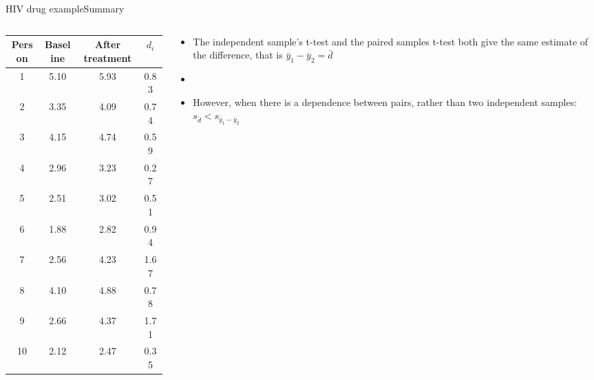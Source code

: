 \documentclass[xcolor=dvipsnames]{beamer}
\begin{document}
\begin{frame}{HIV drug example}{Summary}
\begin{columns}
	\begin{column}{.4 \textwidth}
		{\tiny
			\begin{tabular}{|c|c|c|c|}
				\hline
				\textbf{Person} & \textbf{Baseline} &  \textbf{After treatment} & $d_i$ \\ \hline \hline
				1  &    5.10 &   5.93 &  0.83 \\ \hline 
				2  &    3.35 &   4.09 &  0.74 \\ \hline 
				3  &   4.15  &  4.74 &  0.59 \\ \hline 
				4  &   2.96  &  3.23 &  0.27 \\ \hline 
				5  &    2.51 &   3.02 &  0.51 \\ \hline 
				6  &   1.88  &  2.82 &  0.94 \\ \hline 
				7  &   2.56  &  4.23 &  1.67 \\ \hline 
				8  &    4.10 &   4.88 &  0.78 \\ \hline 
				9  &   2.66  &  4.37 &  1.71 \\ \hline 
				10  &    2.12  &  2.47 &  0.35 \\ \hline 
			\end{tabular}
		}
	\end{column}
	\begin{column}{.6 \textwidth}
		\begin{itemize}
			\item The independent sample's t-test and the paired samples t-test both give the same estimate of the difference, that is $\bar{y}_1-\bar{y}_2 = \bar{d}$ \pause
			\item[]
			\item However, when there is a dependence between pairs, rather than two independent samples: $s_{\bar{d}} < s_{\bar{y}_1 - \bar{y}_2}$ \pause
		\end{itemize}
	\end{column}
\end{columns}
\end{frame}
\end{document}
